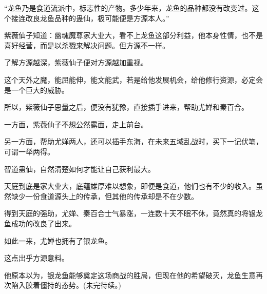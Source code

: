 \begin{this_body}
“龙鱼乃是食道流派中，标志性的产物。多少年来，龙鱼的品种都没有改变过。这个接连改良龙鱼品种的蛊仙，极可能便是方源本人。”

紫薇仙子知道：幽魂魔尊家大业大，看不上龙鱼这部分利益，他本身性情，也不是喜好经营，而是以杀戮来解决问题。但方源不一样。

了解方源越深，紫薇仙子便对方源越加重视。

这个天外之魔，能屈能伸，能文能武，若是给他发展机会，给他修行资源，必定会是一个巨大的威胁。

所以，紫薇仙子思量之后，便没有犹豫，直接插手进来，帮助尤婵和秦百合。

一方面，紫薇仙子不想公然露面，走上前台。

另一方面，帮助尤婵两人，还可以插手东海，在未来五域乱战时，买下一记伏笔，可谓一举两得。

智道蛊仙，自然清楚如何才能让自己获利最大。

天庭到底是家大业大，底蕴雄厚难以想象，即便是食道，他们也有不少的收入。虽然缺少一份食道源头上的传承，但其他的传承却是不在少数。

得到天庭的强助，尤婵、秦百合士气暴涨，一连数十天不眠不休，竟然真的将银龙鱼成功的改良了出来。

如此一来，尤婵也拥有了银龙鱼。

这点出乎方源意料。

他原本以为，银龙鱼能够奠定这场商战的胜局，但现在他的希望破灭，龙鱼生意再次陷入胶着僵持的态势。(未完待续。)

\end{this_body}

